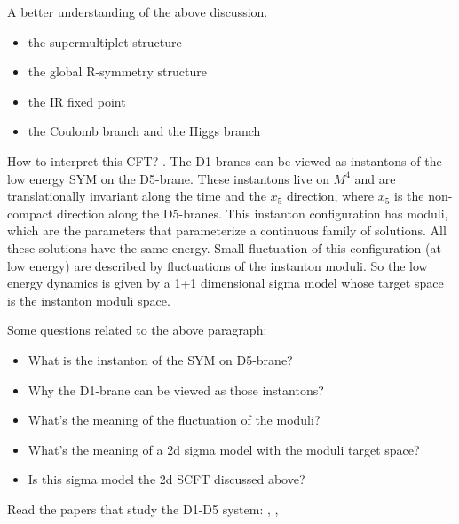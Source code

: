 \begin{question}
A better understanding of the above discussion.
\begin{itemize}
	\item the supermultiplet structure
	\item the global R-symmetry structure
	\item the IR fixed point
	\item the Coulomb branch and the Higgs branch
\end{itemize}
\end{question}

How to interpret this CFT?
.
The D1-branes can be viewed as instantons of the low energy SYM on the D5-brane.
These instantons live on $M^4$
and are translationally invariant along the time and the $x_5$ direction,
where $x_5$ is the non-compact direction along the D5-branes.
This instanton configuration has moduli,
which are the parameters that parameterize a continuous family of solutions.
All these solutions have the same energy.
Small fluctuation of this configuration (at low energy)
are described by fluctuations of the instanton moduli.
So the low energy dynamics is given by a 1+1 dimensional sigma model
whose target space is the instanton moduli space.

\begin{question}
	Some questions related to the above paragraph:
\begin{itemize}
	\item What is the instanton of the SYM on D5-brane?
	\item Why the D1-brane can be viewed as those instantons?
	\item What's the meaning of the fluctuation of the moduli?
	\item What's the meaning of a 2d sigma model with the moduli target space?
	\item Is this sigma model the 2d SCFT discussed above?
\end{itemize}	
\end{question}

\begin{todo}
Read the papers that study the D1-D5 system:
,
,
\end{todo}

